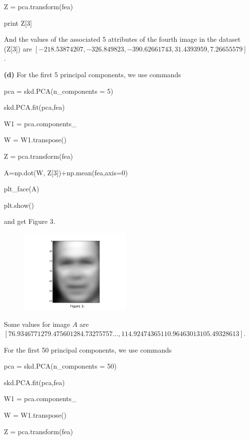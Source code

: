 \documentclass[leqno]{article}
\begin{document}
\noindent Z = pca.transform(fea)

\noindent print Z[3]

\noindent And the values of the associated 5 attributes of the fourth image in the dataset (Z[3]) are 
$[-218.53874207, -326.849823,   -390.62661743,   31.4393959,     7.26655579]$.
 
\hfill

\noindent \textbf{(d)} For the first 5 principal components, we use commands 

\noindent pca = skd.PCA(n\_components = 5)

\noindent skd.PCA.fit(pca,fea)

\noindent W1 = pca.components\_

\noindent W = W1.transpose()

\noindent Z = pca.transform(fea)

\noindent A=np.dot(W, Z[3])+np.mean(fea,axis=0)

\noindent plt\_face(A)

\noindent plt.show()

\noindent and get Figure 3.

\begin{figure}[h!]
\includegraphics[width=0.5\textwidth]{figure_5d1}  
\end{figure}

\noindent Some values for image $A$ are $[  76.93467712   79.4756012    84.73275757 ...,  114.92474365  110.96463013 105.49328613]$.

\hfill 

\noindent For the first 50 principal components, we use commands

\noindent pca = skd.PCA(n\_components = 50)

\noindent skd.PCA.fit(pca,fea)

\noindent W1 = pca.components\_

\noindent W = W1.transpose()

\noindent Z = pca.transform(fea)
\end{document}
